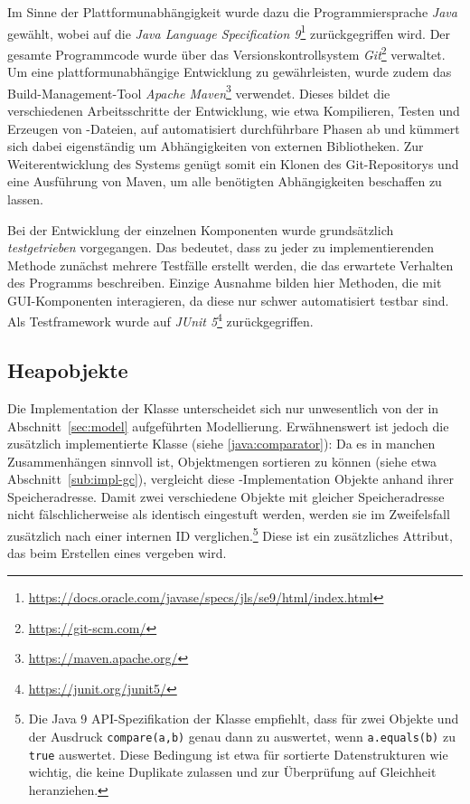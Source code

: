 Im Sinne der Plattformunabhängigkeit wurde dazu die Programmiersprache \textit{Java} gewählt, wobei auf die \textit{Java Language Specification 9}\footnote{\url{https://docs.oracle.com/javase/specs/jls/se9/html/index.html}} zurückgegriffen wird.
Der gesamte Programmcode wurde über das Versionskontrollsystem \textit{Git}\footnote{\url{https://git-scm.com/}} verwaltet.
Um eine plattformunabhängige Entwicklung zu gewährleisten, wurde zudem das Build-Management-Tool \textit{Apache Maven}\footnote{\url{https://maven.apache.org/}} verwendet.
Dieses bildet die verschiedenen Arbeitsschritte der Entwicklung, wie etwa Kompilieren, Testen und Erzeugen von -Dateien, auf automatisiert durchführbare Phasen ab und kümmert sich dabei eigenständig um Abhängigkeiten von externen Bibliotheken.
Zur Weiterentwicklung des Systems genügt somit ein Klonen des Git-Repositorys und eine Ausführung von Maven, um alle benötigten Abhängigkeiten beschaffen zu lassen.

Bei der Entwicklung der einzelnen Komponenten wurde grundsätzlich \textit{testgetrieben} vorgegangen.
Das bedeutet, dass zu jeder zu implementierenden Methode zunächst mehrere Testfälle erstellt werden, die das erwartete Verhalten des Programms beschreiben.
Einzige Ausnahme bilden hier Methoden, die mit GUI-Komponenten interagieren, da diese nur schwer automatisiert testbar sind.
Als Testframework wurde auf \textit{JUnit 5}\footnote{\url{https://junit.org/junit5/}} zurückgegriffen.

\subsection{Heapobjekte}
\label{sub:heapobject}
Die Implementation der Klasse  unterscheidet sich nur unwesentlich von der in Abschnitt~\ref{sec:model} aufgeführten Modellierung.
Erwähnenswert ist jedoch die zusätzlich implementierte Klasse  (siehe \ref{java:comparator}):
Da es in manchen Zusammenhängen sinnvoll ist, Objektmengen sortieren zu können (siehe etwa Abschnitt~\ref{sub:impl-gc}), vergleicht diese -Implementation Objekte anhand ihrer Speicheradresse.
Damit zwei verschiedene Objekte mit gleicher Speicheradresse nicht fälschlicherweise als identisch eingestuft werden, werden sie im Zweifelsfall zusätzlich nach einer internen ID verglichen.\footnote{Die Java 9 API-Spezifikation der Klasse  empfiehlt, dass für zwei Objekte  und  der Ausdruck \texttt{compare(a,b)} genau dann zu  auswertet, wenn \texttt{a.equals(b)} zu \texttt{true} auswertet. Diese Bedingung ist etwa für sortierte Datenstrukturen wie  wichtig, die keine Duplikate zulassen und  zur Überprüfung auf Gleichheit heranziehen.}
Diese ist ein zusätzliches Attribut, das beim Erstellen eines  vergeben wird.

